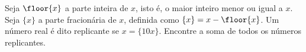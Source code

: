 Seja $\floor{x}$ a parte inteira de $x$, isto é, o maior inteiro menor ou igual a $x$.
Seja $\{x\}$ a parte fracionária de $x$, definida como $\{x\} = x - \floor{x}$.
Um número real é dito replicante se $x = \{10x\}$.
Encontre a soma de todos os números replicantes.
